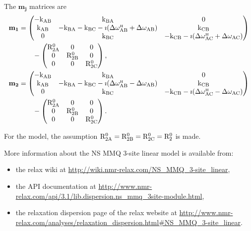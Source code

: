 The $\mathbf{m_j}$ matrices are
\begin{subequations}
\begin{align}
    \mathbf{m_1} &= \begin{pmatrix}
                        -\textrm{k}_\textrm{AB}   & \textrm{k}_\textrm{BA}                                  & 0    \\
                        \textrm{k}_\textrm{AB}    & -\textrm{k}_\textrm{BA} -\textrm{k}_\textrm{BC} -\imath(\Delta\omega^{\scriptscriptstyle\mathrm{H}}_\textrm{AB} + \Delta\omega_\textrm{AB})   & \textrm{k}_\textrm{CB} \\
                        0       & \textrm{k}_\textrm{BC}                                  & - \textrm{k}_\textrm{CB}  -\imath(\Delta\omega^{\scriptscriptstyle\mathrm{H}}_\textrm{AC} + \Delta\omega_\textrm{AC})
                    \end{pmatrix}  \nonumber \\
                 &\qquad - \begin{pmatrix}
                               \mathrm{R}_\mathrm{2A}^0 & 0          & 0    \\
                               0          & \mathrm{R}_\mathrm{2B}^0 & 0    \\
                               0          & 0          & \mathrm{R}_\mathrm{2C}^0
                           \end{pmatrix}, \\
    \mathbf{m_2} &= \begin{pmatrix}
                        -\textrm{k}_\textrm{AB}   & \textrm{k}_\textrm{BA}                                  & 0    \\
                        \textrm{k}_\textrm{AB}    & -\textrm{k}_\textrm{BA} -\textrm{k}_\textrm{BC} -\imath(\Delta\omega^{\scriptscriptstyle\mathrm{H}}_\textrm{AB} - \Delta\omega_\textrm{AB})   & \textrm{k}_\textrm{CB} \\
                        0       & \textrm{k}_\textrm{BC}                                  & -\textrm{k}_\textrm{CB} -\imath(\Delta\omega^{\scriptscriptstyle\mathrm{H}}_\textrm{AC} - \Delta\omega_\textrm{AC})
                    \end{pmatrix}  \nonumber \\
                 &\qquad - \begin{pmatrix}
                               \mathrm{R}_\mathrm{2A}^0 & 0          & 0    \\
                               0          & \mathrm{R}_\mathrm{2B}^0 & 0    \\
                               0          & 0          & \mathrm{R}_\mathrm{2C}^0
                           \end{pmatrix}.
\end{align}
\end{subequations}

For the model, the assumption $\mathrm{R}_\mathrm{2A}^0 = \mathrm{R}_\mathrm{2B}^0 = \mathrm{R}_\mathrm{2C}^0 = \mathrm{R}_2^0$ is made.

More information about the NS MMQ 3-site linear model is available from:
\begin{itemize}
  \item the relax wiki at \url{http://wiki.nmr-relax.com/NS\_MMQ\_3-site\_linear},
  \item the API documentation at \url{http://www.nmr-relax.com/api/3.1/lib.dispersion.ns\_mmq\_3site-module.html},
  \item the relaxation dispersion page of the relax website at \url{http://www.nmr-relax.com/analyses/relaxation\_dispersion.html#NS\_MMQ\_3-site\_linear}.
\end{itemize}


